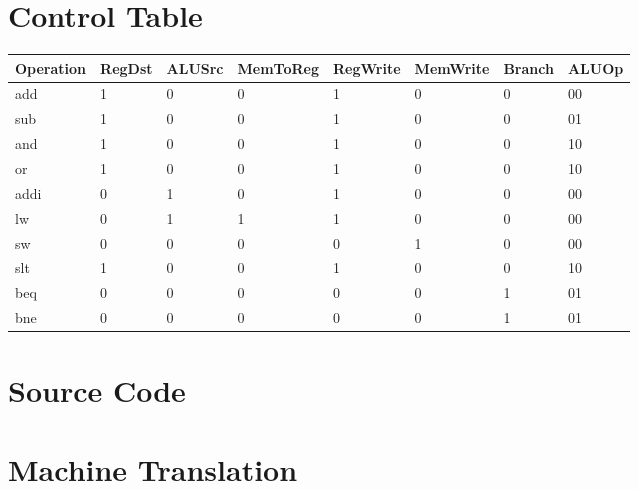 \documentclass{article}
\newenvironment{problem}[1]{
  \nobreak\section*{#1}
}{}
\begin{document}
  \begin{problem}{Control Table}
    \begin{table}[]
      \begin{tabular}{@{}llllllll@{}}
      Operation & RegDst & ALUSrc & MemToReg & RegWrite & MemWrite & Branch & ALUOp \\ \midrule
      add & 1 & 0 & 0 & 1 & 0 & 0 & 00 \\
      sub & 1 & 0 & 0 & 1 & 0 & 0 & 01 \\
      and & 1 & 0 & 0 & 1 & 0 & 0 & 10 \\
      or & 1 & 0 & 0 & 1 & 0 & 0 & 10 \\
      addi & 0 & 1 & 0 & 1 & 0 & 0 & 00 \\
      lw & 0 & 1 & 1 & 1 & 0 & 0 & 00 \\
      sw & 0 & 0 & 0 & 0 & 1 & 0 & 00 \\
      slt & 1 & 0 & 0 & 1 & 0 & 0 & 10 \\
      beq & 0 & 0 & 0 & 0 & 0 & 1 & 01 \\
      bne & 0 & 0 & 0 & 0 & 0 & 1 & 01
      \end{tabular}
    \end{table}
  \end{problem}

  \begin{problem}{Source Code}
    
  \end{problem}

  \begin{problem}{Machine Translation}
    
  \end{problem}
\end{document}
